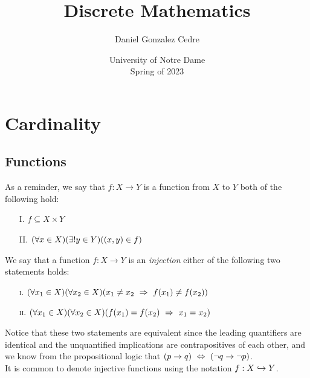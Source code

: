 





\title{Discrete Mathematics}
\author{Daniel Gonzalez Cedre}
\date{University of Notre Dame \\ Spring of 2023}
\maketitle

\setcounter{chapter}{5}
\chapter{Cardinality}

\section{Functions}

\begin{definition}[Function]
    As a reminder,
    we say that $f: X \to Y$ is a function from $X$ to $Y$ \ifandonlyif both of the following hold:
    \begin{enumerate}
        \item[I.]
            $f \subseteq X \times Y$
        \item[II.]
            $\pn*{\forall x \in X}\pn*{\exists ! y \in Y}\pn*{(x, y) \in f}$
    \end{enumerate}
\end{definition}

\begin{definition}[Injectivity]
    We say that a function $f: X \to Y$ is an \emph{injection}
    \iffbydefn either of the following two statements holds:
    \begin{enumerate}
        \item[\textsc{i.}]
            $\pn*{\forall x_1 \in X}\pn*{\forall x_2 \in X}\pn*{x_1 \neq x_2 \implies f(x_1) \neq f(x_2)}$
        \item[\textsc{ii.}]
            $\pn*{\forall x_1 \in X}\pn*{\forall x_2 \in X}\pn*{f(x_1) = f(x_2) \implies x_1 = x_2}$
    \end{enumerate}
    Notice that these two statements are equivalent
    since the leading quantifiers are identical
    and the unquantified implications are contrapositives of each other,
    and we know from the propositional logic that $\pn*{p \rightarrow q} \iff \pn*{\neg q \rightarrow \neg p}$.\\
    It is common to denote injective functions using the notation $f: X \hookrightarrow Y$.
\end{definition}


